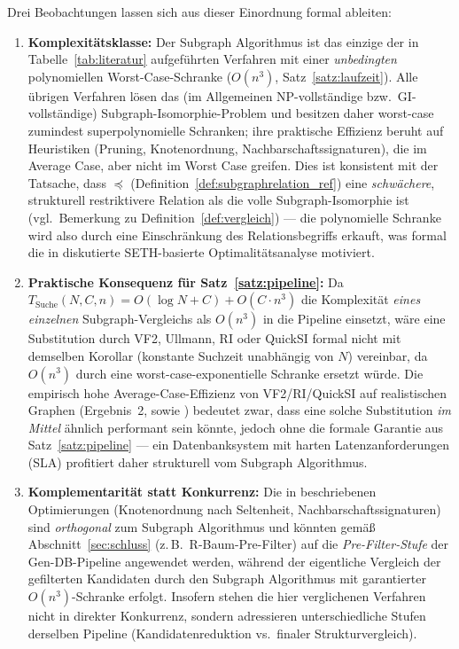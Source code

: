 \documentclass[a4paper,12pt, twoside]{report}
\theoremstyle{definition}
\begin{document}
Drei Beobachtungen lassen sich aus dieser Einordnung formal ableiten:

\begin{enumerate}
	\item \textbf{Komplexitätsklasse:} Der Subgraph Algorithmus ist das einzige der in Tabelle~\ref{tab:literatur} aufgeführten Verfahren mit einer \emph{unbedingten} polynomiellen Worst-Case-Schranke ($O(n^3)$, Satz~\ref{satz:laufzeit}). Alle übrigen Verfahren lösen das (im Allgemeinen NP-vollständige bzw.\ GI-vollständige) Subgraph-Isomorphie-Problem und besitzen daher worst-case zumindest superpolynomielle Schranken; ihre praktische Effizienz beruht auf Heuristiken (Pruning, Knoten\-ordnung, Nachbarschaftssignaturen), die im Average Case, aber nicht im Worst Case greifen. Dies ist konsistent mit der Tatsache, dass $\preceq$ (Definition~\ref{def:subgraphrelation_ref}) eine \emph{schwächere}, strukturell restriktivere Relation als die volle Subgraph-Isomorphie ist (vgl.\ Bemerkung zu Definition~\ref{def:vergleich}) — die polynomielle Schranke wird also durch eine Einschränkung des Relationsbegriffs erkauft, was formal die in \cite{epp2026subgraph} diskutierte SETH-basierte Optimalitätsanalyse motiviert.
	\item \textbf{Praktische Konsequenz für Satz~\ref{satz:pipeline}:} Da $T_{\text{Suche}}(N,C,n)=O(\log N+C)+O(C\cdot n^3)$ die Komplexität \emph{eines einzelnen} Subgraph-Vergleichs als $O(n^3)$ in die Pipeline einsetzt, wäre eine Substitution durch VF2, Ullmann, RI oder QuickSI formal nicht mit demselben Korollar (konstante Suchzeit unabhängig von $N$) vereinbar, da $O(n^3)$ durch eine worst-case-exponentielle Schranke ersetzt würde. Die empirisch hohe Average-Case-Effizienz von VF2/RI/QuickSI auf realistischen Graphen (Ergebnis~2, sowie \cite{he2008,bonnici2013}) bedeutet zwar, dass eine solche Substitution \emph{im Mittel} ähnlich performant sein könnte, jedoch ohne die formale Garantie aus Satz~\ref{satz:pipeline} — ein Datenbanksystem mit harten Latenzanforderungen (SLA) profitiert daher strukturell vom Subgraph Algorithmus.
	\item \textbf{Komplementarität statt Konkurrenz:} Die in \cite{bonnici2013,he2008} beschriebenen Optimierungen (Knotenordnung nach Seltenheit, Nachbarschaftssignaturen) sind \emph{orthogonal} zum Subgraph Algorithmus und könnten gemäß Abschnitt~\ref{sec:schluss} (z.\,B.\ R-Baum-Pre-Filter) auf die \emph{Pre-Filter-Stufe} der Gen-DB-Pipeline angewendet werden, während der eigentliche Vergleich der gefilterten Kandidaten durch den Subgraph Algorithmus mit garantierter $O(n^3)$-Schranke erfolgt. Insofern stehen die hier verglichenen Verfahren nicht in direkter Konkurrenz, sondern adressieren unterschiedliche Stufen derselben Pipeline (Kandidatenreduktion vs.\ finaler Strukturvergleich).
\end{enumerate}
\end{document}
